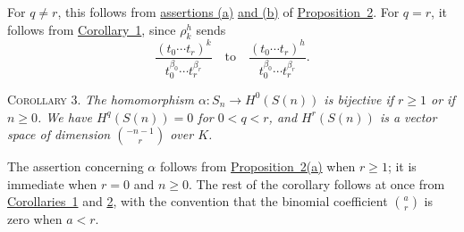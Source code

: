 For $q\neq r$, this follows from
\hyperref[fac:III:3:no:62:prop:2:item:a]{assertions (a)}
\hyperref[fac:III:3:no:62:prop:2:item:b]{and (b)} of
\hyperref[fac:III:3:no:62:prop:2]{Proposition~2}. For $q=r$, it follows
from \hyperref[fac:III:3:no:62:cor:1]{Corollary~1}, since $\rho_k^h$
sends
\[
\frac{(t_0\cdots t_r)^k}{t_0^{\beta_0}\cdots t_r^{\beta_r}}
\quad\text{to}\quad
\frac{(t_0\cdots t_r)^h}{t_0^{\beta_0}\cdots t_r^{\beta_r}}.
\]

\label{fac:III:3:no:62:cor:3}
\textsc{Corollary 3.} \textit{The homomorphism
$\alpha:S_n\to H^0(S(n))$ is bijective if $r\geq1$ or if $n\geq0$.
We have $H^q(S(n))=0$ for $0<q<r$, and $H^r(S(n))$ is a vector space
of dimension $\binom{-n-1}{r}$ over $K$.}

The assertion concerning $\alpha$ follows from
\hyperref[fac:III:3:no:62:prop:2:item:a]{Proposition~2(a)} when
$r\geq1$; it is immediate when $r=0$ and $n\geq0$. The rest of the
corollary follows at once from
\hyperref[fac:III:3:no:62:cor:1]{Corollaries~1} and
\hyperref[fac:III:3:no:62:cor:2]{2}, with the convention that the
binomial coefficient $\binom{a}{r}$ is zero when $a<r$.
